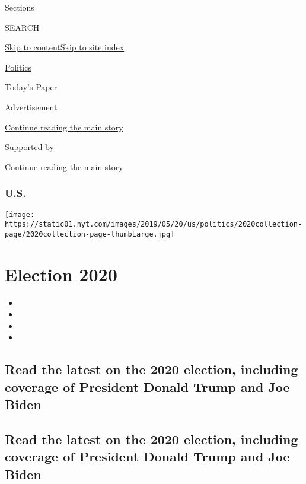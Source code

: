Sections

SEARCH

\protect\hyperlink{site-content}{Skip to
content}\protect\hyperlink{site-index}{Skip to site index}

\href{https://www.nytimes.com/section/politics}{Politics}

\href{https://myaccount.nytimes.com/auth/login?response_type=cookie\&client_id=vi}{}

\href{https://www.nytimes.com/section/todayspaper}{Today's Paper}

Advertisement

\protect\hyperlink{after-top}{Continue reading the main story}

Supported by

\protect\hyperlink{after-sponsor}{Continue reading the main story}

\hypertarget{us}{%
\subsubsection{\texorpdfstring{\href{/section/us}{U.S.}}{U.S.}}\label{us}}

\texttt{[image: https://static01.nyt.com/images/2019/05/20/us/politics/2020collection-page/2020collection-page-thumbLarge.jpg]}

\hypertarget{election-2020}{%
\section{Election 2020}\label{election-2020}}

\begin{itemize}
\item
\item
\item
\item
\end{itemize}

\hypertarget{read-the-latest-on-the-2020-election-including-coverage-of-president-donald-trump-and-joe-biden}{%
\subsection{Read the latest on the 2020 election, including coverage of
President Donald Trump and Joe
Biden}\label{read-the-latest-on-the-2020-election-including-coverage-of-president-donald-trump-and-joe-biden}}

\hypertarget{read-the-latest-on-the-2020-election-including-coverage-of-president-donald-trump-and-joe-biden-1}{%
\subsection{Read the latest on the 2020 election, including coverage of
President Donald Trump and Joe
Biden}\label{read-the-latest-on-the-2020-election-including-coverage-of-president-donald-trump-and-joe-biden-1}}

